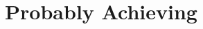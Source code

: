 \documentclass{article}
\begin{document}
\title{Probably Achieving}
\author{}
\date{}

\maketitle
\end{document}

